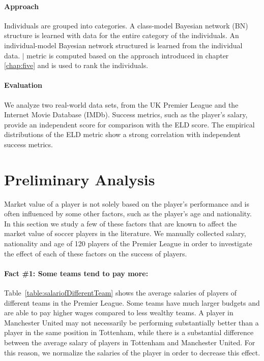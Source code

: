 \paragraph{Approach}
Individuals are grouped into categories. A class-model Bayesian network (BN) structure is learned with data for the entire category of the individuals. An individual-model Bayesian network structured is learned  from the individual data. $\mid$ metric is computed based on the approach introduced in chapter \ref{chap:five} and is used to rank the individuals.
\paragraph{Evaluation}
We analyze two real-world data sets, from the UK Premier League and the Internet Movie Database
(IMDb). 
 Success metrics, such as the player's salary, provide an independent
score for comparison with the ELD score. The empirical distributions of the ELD metric show a strong correlation with independent success metrics.
 \section{Preliminary Analysis}
 Market value of a player is not solely based on the player's performance and is often influenced by some other factors, such as the player's age and nationality.\\
 In this section we study a few of these factors that are known to affect the market value of soccer players in the literature. We manually collected salary, nationality and age of 120 players of the Premier League in order to investigate the effect of each of these factors on the success of players.  
 \paragraph{Fact \#1: Some teams tend to pay more:} Table~\ref{table:salariofDifferentTeam} shows the average salaries of players of different teams in the Premier League. Some teams have much larger
 budgets and are able to pay higher wages compared to less wealthy teams. A player in Manchester United may not necessarily be performing substantially better than a player in the same position in Tottenham, while there is a substantial difference between the average salary of players in Tottenham and Manchester United. For this reason, we normalize the salaries of the player in order to decrease this effect. %
 
